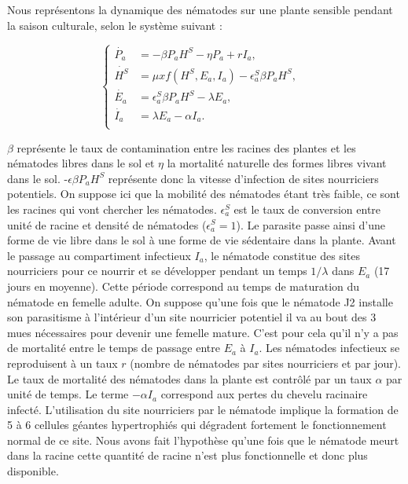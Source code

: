 	
	Nous représentons la dynamique des nématodes sur une plante sensible  pendant la saison culturale, selon le système  suivant : 
	
\begin{equation} 
	\left\{
		\begin{aligned}
		\dot{P_a} & =-\beta P_a H^S -\eta P_a + r I_a,&\\
		\dot{H^S} &= \mu x f(H^S,E_a,I_a) -\epsilon_a^S \beta P_a H^S,& \\
		\dot{E_a} &=  \epsilon_a^S \beta P_a H^S  - \lambda E_a, &\\
		\dot{I_a} & = \lambda E_a -\alpha I_a.&\\
		\end{aligned}
	\right.		
	\label{eq:planteS-nemavir}																		
\end{equation}
		
	$\beta$ représente le taux de contamination entre les racines des plantes et les
nématodes libres dans le sol et  $\eta$  la mortalité naturelle 
des formes libres vivant dans le sol. -$ \epsilon \beta P_a H^S$ représente donc la vitesse d'infection de sites nourriciers potentiels. On suppose ici que la mobilité des nématodes étant très faible, ce sont les racines qui vont chercher les nématodes.  $\epsilon_a^S$ est  le taux de conversion entre unité de racine et densité de nématodes ($\epsilon_a^S=1$). Le  parasite passe ainsi d'une forme de vie libre  dans le sol à une forme de vie sédentaire dans la plante. Avant le passage au compartiment infectieux $I_a$, le nématode constitue des sites nourriciers pour ce nourrir et se développer  pendant un temps $1/\lambda$ dans $E_a$ (17 jours en moyenne). Cette période correspond au temps de  maturation du nématode en femelle adulte. On suppose qu'une fois que le nématode J2 installe son parasitisme à l'intérieur d'un site nourricier potentiel il va au bout des 3 mues nécessaires pour devenir une femelle mature. C'est pour cela qu'il n'y a pas de mortalité entre le temps de passage entre $E_a$ à $I_a$.
Les nématodes infectieux se reproduisent à un taux $r$  (nombre de nématodes par sites nourriciers et par jour). Le taux de mortalité des nématodes dans la plante est contrôlé  par un taux  $\alpha$ par unité de temps.   Le terme $-\alpha I_a$ correspond aux pertes du chevelu racinaire infecté. L'utilisation du site nourriciers par le nématode implique la formation de 5 à 6 cellules géantes hypertrophiés qui dégradent fortement le fonctionnement normal de ce site. Nous avons  fait l'hypothèse  qu'une fois que le nématode meurt dans la racine cette quantité de racine n'est plus fonctionnelle et donc plus disponible. 
	
